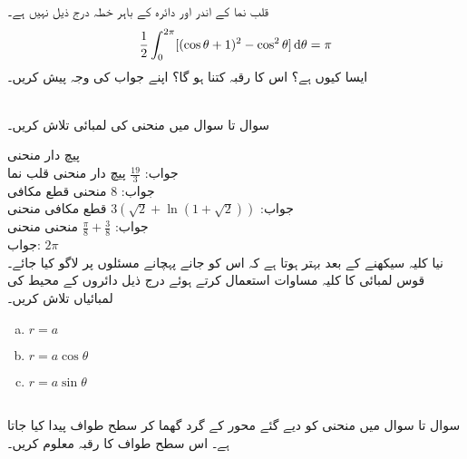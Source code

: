 قلب نما  کے اندر اور دائرہ  کے باہر خطہ درج ذیل نہیں ہے۔
\begin{align*}
\frac{1}{2}\int_{0}^{2\pi}[(\cos\theta+1)^2-\cos^2\theta]\dif\theta=\pi
\end{align*}
ایسا کیوں ہے؟ اس کا رقبہ کتنا ہو گا؟  اپنے جواب کی وجہ پیش کریں۔

\\
سوال  تا سوال  میں منحنی کی لمبائی تلاش کریں۔

پیچ دار منحنی \\
جواب:\quad
$\tfrac{19}{3}$
پیچ دار منحنی 
قلب نما \\
جواب:\quad
$8$
منحنی 
قطع مکافی \\
جواب:\quad
$3(\sqrt{2}+\ln(1+\sqrt{2}))$
قطع مکافی 
منحنی \\
جواب:\quad
$\tfrac{\pi}{8}+\tfrac{3}{8}$
منحنی 
منحنی \\
جواب:\quad
$2\pi$
\\
نیا کلیہ سیکھنے کے بعد بہتر ہوتا ہے کہ اس کو جانے پہچانے مسئلوں پر لاگو کیا جائے۔ قوس لمبائی کا کلیہ مساوات  استعمال کرتے ہوئے درج ذیل دائروں کے محیط کی لمبائیاں تلاش کریں۔
\begin{multicols}{3}
\begin{enumerate}[a.]
\item
$r=a$
\item
$r=a\cos\theta$
\item
$r=a\sin\theta$
\end{enumerate} 
\end{multicols}
\\
سوال  تا سوال  میں منحنی کو دیے گئے محور کے گرد گھما کر سطح طواف پیدا کیا جاتا ہے۔ اس سطح طواف کا رقبہ معلوم کریں۔

